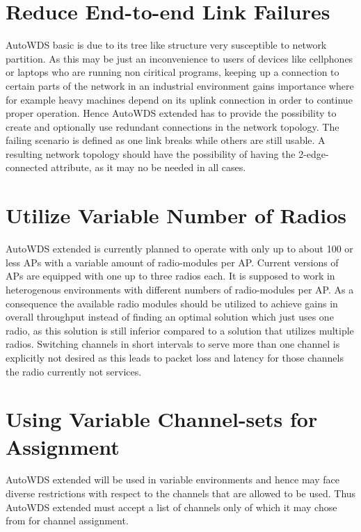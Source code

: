   \section{Reduce End-to-end Link Failures}
  \label{regendtoend}
  AutoWDS basic is due to its tree like structure very susceptible to network partition.
  As this may be just an inconvenience to users of devices like cellphones or laptops who are running non ciritical programs, 
  keeping up a connection to certain parts of the network in an industrial environment gains importance where for example heavy machines depend on its uplink connection in order 
  to continue proper operation. Hence AutoWDS extended has to provide the possibility to create and optionally use
  redundant connections in the network topology. The failing scenario is defined as one link breaks while others are still usable.
  A resulting network topology should have the possibility of having the 2-edge-connected attribute, as it may no be needed in all cases.
  
  \section{Utilize Variable Number of Radios}
  \label{utilvarnumradio}
  AutoWDS extended is currently planned to operate with only up to about 100 or less APs with a variable amount of radio-modules per AP.
  Current versions of APs are equipped with one up to three radios each. It is supposed to work in heterogenous environments with 
  different numbers of radio-modules per AP. As a consequence the available radio modules 
  should be utilized to achieve gains in overall throughput instead of finding an optimal solution which just uses one radio, as this solution is
  still inferior compared to a solution that utilizes multiple radios.
  Switching channels in short intervals to serve more than one channel is explicitly not desired as this leads to packet loss and latency for those channels the radio
  currently not services.
  
  \section{Using Variable Channel-sets for Assignment}
  AutoWDS extended will be used in variable environments and hence may face diverse restrictions with respect to the channels that are allowed to be used.
  Thus AutoWDS extended must accept a list of channels only of which it may chose from for channel assignment.
  
